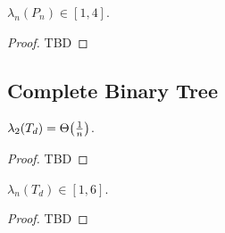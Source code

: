 \begin{lem} $\lambda_n(P_n) \in [1,4]$.
\end{lem}
\begin{proof}
TBD
\end{proof}

\subsection{Complete Binary Tree}

\begin{lem} $\lambda_2(T_d) = \Theta\parentheses*{\frac{1}{n}}$.
\end{lem}
\begin{proof}
TBD
\end{proof}

\begin{lem} $\lambda_n(T_d) \in [1,6]$.
\end{lem}
\begin{proof}
TBD
\end{proof}
